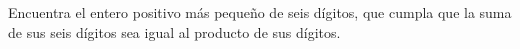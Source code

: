 Encuentra el entero positivo más pequeño de seis dígitos, que cumpla que la suma de sus seis dígitos sea igual al producto de sus dígitos.